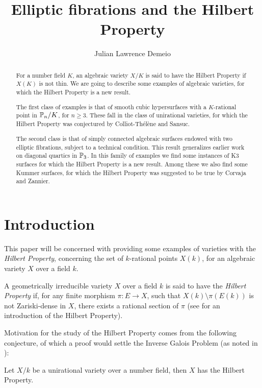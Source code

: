 \documentclass[a4paper,12pt]{article}
\begin{document}
	\title{Elliptic fibrations and the Hilbert Property}
	\author{Julian Lawrence Demeio}


\maketitle

\begin{abstract}
	For a number field $K$, an algebraic variety $X/K$ is said to have the Hilbert Property if $X(K)$ is not thin. We are going to describe some examples of algebraic varieties, for which the Hilbert Property is a new result.
	
	The first class of examples is that of smooth cubic hypersurfaces with a $K$-rational point in $\P_n/K$, for $n \geq 3$. These fall in the class of unirational varieties, for which the Hilbert Property was conjectured by Colliot-Thélène and Sansuc.
	
	The second class is that of simply connected algebraic surfaces endowed with two elliptic fibrations, subject to a technical condition. This result generalizes earlier work on diagonal quartics in $\P_3$. In this family of examples we find some instances of K3 surfaces for which the Hilbert Property is a new result. Among these we also find some Kummer surfaces, for which the Hilbert Property was suggested to be true by Corvaja and Zannier.
\end{abstract}

\section{Introduction}

This paper will be concerned with providing some examples of varieties with the \textit{Hilbert Property}, concerning the set of $k$-rational points $X(k)$, for an algebraic variety $X$ over a field $k$.

A geometrically irreducible variety $X$ over a field $k$ is said to have the \textit{Hilbert Property} if, for any finite morphism $\pi:E \rightarrow X$, such that $X(k)\setminus \pi(E(k))$ is not Zariski-dense in $X$, there exists a rational section of $\pi$ (see  \cite[Ch. 3]{Serre} for an introduction of the Hilbert Property).


Motivation for the study of the Hilbert Property comes from the following conjecture, of which a proof would settle the Inverse Galois Problem (as noted in \cite{congetturastrong}):


\begin{conjecture}\label{congetturona}
	Let $X/k$ be a unirational variety over a number field, then $X$ has the Hilbert Property.
\end{conjecture}
\end{document}
